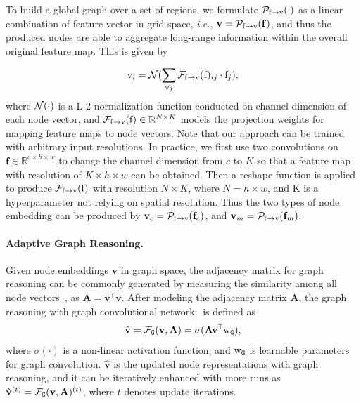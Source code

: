 \documentclass[letterpaper]{article} %
\begin{document}
To build a global graph over a set of regions, we formulate ${\cal P}_{{\mathrm f}\rightarrow {\mathrm v}}(\cdot)$ as a linear combination of feature vector in grid space, {\em i.e.}, ${\mathbf v} = {\cal P}_{{\mathrm f}\rightarrow {\mathrm v}}({\mathbf f})$, and thus the produced nodes are able to aggregate long-range information within the overall original feature map. This is given by 

\begin{equation}
	{\mathrm v}_i = {\cal N}(\sum_{\forall j}{\cal F}_{{\mathrm f}\rightarrow {\mathrm v}}({\mathrm f})_{ij} \cdot {\mathrm f}_j),
	\label{eq1}
\end{equation} 
where ${\cal N}(\cdot)$ is a L-2 normalization function conducted on channel dimension of each node vector, and ${\cal F}_{{\mathrm f}\rightarrow {\mathrm v}}({\mathrm f}) \in \mathbb{R}^{N \times K}$ models the projection weights for mapping feature maps to node vectors.
Note that our approach can be trained with arbitrary input resolutions. In practice, we first use two convolutions on ${\mathbf f} \in \mathbb{R}^{c \times h \times w}$ to change the channel dimension from $c$ to $K$ so that a feature map with resolution of $K \times h \times w$ can be obtained. Then a reshape function is applied to produce ${\cal F}_{{\mathrm f}\rightarrow {\mathrm v}}({\mathrm f})$ with resolution $N \times K$, where $N = h \times w$, and K is a hyperparameter not relying on spatial resolution. Thus the two types of node embedding can be produced by ${\mathbf v}_c = {\cal P}_{{\mathrm f}\rightarrow {\mathrm v}}({\mathbf f}_c)$, and ${\mathbf v}_m = {\cal P}_{{\mathrm f}\rightarrow {\mathrm v}}({\mathbf f}_m)$.

\paragraph{Adaptive Graph Reasoning.}

Given node embeddings ${\mathbf v}$ in graph space, the adjacency matrix for graph reasoning can be commonly generated by measuring the similarity among all node vectors~\cite{Li2018BeyondGL}, as ${\mathbf A} = {\mathbf v}^{\mathsf T}{\mathbf v}$. After modeling the adjacency matrix ${\mathbf A}$, the graph reasoning with graph convolutional network~\cite{Kipf2017SemiSupervisedCW} is defined as
\begin{equation}
	\hat{\mathbf v} = {\cal F}_{\tt G}({\mathbf v}, {\mathbf A}) = \sigma({\mathbf A} {\mathbf v}^\mathsf{T} {\mathrm w}_{\tt G}),
\end{equation}
where $\sigma(\cdot)$ is a non-linear activation function, and ${\mathrm w}_{\tt G}$ is learnable parameters for graph convolution. $\hat{\mathbf v}$ is the updated node representations with graph reasoning, and it can be iteratively enhanced with more runs as $\hat{\mathbf v}^{(t)} = {\cal F}_{\tt G}({\mathbf v}, {\mathbf A})^{(t)}$, where $t$ denotes update iterations.
\end{document}
